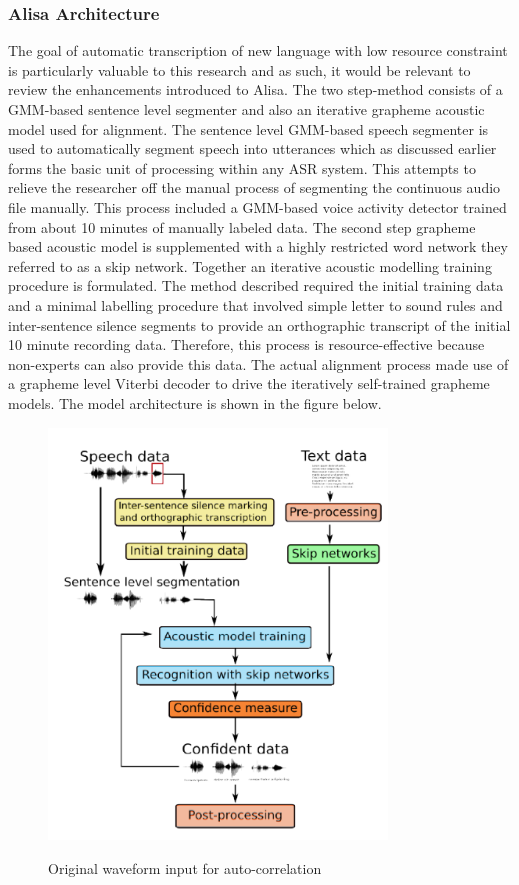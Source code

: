 \subsubsection{Alisa Architecture}
The goal of automatic transcription of new language with low resource constraint is particularly valuable to this research and as such, it would be relevant to review the enhancements introduced to Alisa.  The two step-method consists of a GMM-based sentence level segmenter and also an iterative grapheme acoustic model used for alignment.  The sentence level GMM-based speech segmenter is used to automatically segment speech into utterances which as discussed earlier forms the basic unit of processing within any ASR system.  This attempts to relieve the researcher off the manual process of segmenting the continuous audio file manually. This process included a GMM-based voice activity detector trained from about 10 minutes of manually labeled data. The second step grapheme based acoustic model is supplemented with a highly restricted word network they referred to as a skip network.  Together an iterative acoustic modelling training procedure is formulated.  The method described required the initial training data and a minimal labelling procedure that involved simple letter to sound rules and inter-sentence silence segments to provide an orthographic transcript of the initial 10 minute recording data.  Therefore, this process is resource-effective because non-experts can also provide this data.  The actual alignment process made use of a grapheme level Viterbi decoder to drive the iteratively self-trained grapheme models.  The model architecture is shown in the figure below.
\begin{figure}
\centering
  \includegraphics[width=9cm]{thesis/images/alisa}\\
  \caption{Original waveform input for auto-correlation}\label{fig_c3_exp03}
\end{figure}

